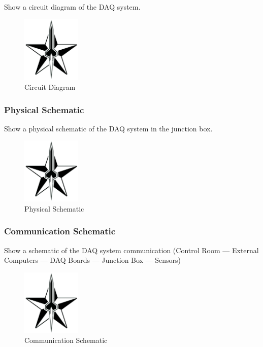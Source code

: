\documentclass[10pt,a4paper]{article}
\begin{document}
Show a circuit diagram of the DAQ system.

\begin{figure}[h!]
	\centering
	\includegraphics[width=0.25\textwidth]{./figs/logo_srt.png}
	\caption{Circuit Diagram}
	\label{fig:example}
\end{figure}

\subsubsection{Physical Schematic}

Show a physical schematic of the DAQ system in the junction box. 

\begin{figure}[h!]
	\centering
	\includegraphics[width=0.25\textwidth]{./figs/logo_srt.png}
	\caption{Physical Schematic}
	\label{fig:example}
\end{figure}

\subsubsection{Communication Schematic}

Show a schematic of the DAQ system communication (Control Room --- External Computers --- DAQ Boards --- Junction Box --- Sensors)

\begin{figure}[h!]
	\centering
	\includegraphics[width=0.25\textwidth]{./figs/logo_srt.png}
	\caption{Communication Schematic}
	\label{fig:example}
\end{figure}
\end{document}
